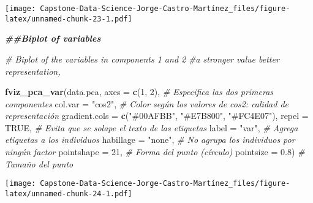 \documentclass[
]{article}
\newenvironment{Shaded}{\begin{snugshade}}{\end{snugshade}}
\newcommand{\AttributeTok}[1]{\textcolor[rgb]{0.13,0.29,0.53}{#1}}
\newcommand{\CommentTok}[1]{\textcolor[rgb]{0.56,0.35,0.01}{\textit{#1}}}
\newcommand{\ConstantTok}[1]{\textcolor[rgb]{0.56,0.35,0.01}{#1}}
\newcommand{\DecValTok}[1]{\textcolor[rgb]{0.00,0.00,0.81}{#1}}
\newcommand{\DocumentationTok}[1]{\textcolor[rgb]{0.56,0.35,0.01}{\textbf{\textit{#1}}}}
\newcommand{\FloatTok}[1]{\textcolor[rgb]{0.00,0.00,0.81}{#1}}
\newcommand{\FunctionTok}[1]{\textcolor[rgb]{0.13,0.29,0.53}{\textbf{#1}}}
\newcommand{\NormalTok}[1]{#1}
\newcommand{\OtherTok}[1]{\textcolor[rgb]{0.56,0.35,0.01}{#1}}
\newcommand{\SpecialCharTok}[1]{\textcolor[rgb]{0.81,0.36,0.00}{\textbf{#1}}}
\newcommand{\StringTok}[1]{\textcolor[rgb]{0.31,0.60,0.02}{#1}}
\begin{document}
\texttt{[image: Capstone-Data-Science-Jorge-Castro-Martínez\_files/figure-latex/unnamed-chunk-23-1.pdf]}

\begin{Shaded}
\begin{Highlighting}[]
\DocumentationTok{\#\#Biplot of variables}

\CommentTok{\# Biplot of the variables in components 1 and 2}
\CommentTok{\#a stronger value better representation,}

\FunctionTok{fviz\_pca\_var}\NormalTok{(data.pca,}
             \AttributeTok{axes =} \FunctionTok{c}\NormalTok{(}\DecValTok{1}\NormalTok{, }\DecValTok{2}\NormalTok{),          }\CommentTok{\# Especifica las dos primeras componentes}
             \AttributeTok{col.var =} \StringTok{"cos2"}\NormalTok{,        }\CommentTok{\# Color según los valores de cos2: calidad de representación}
             \AttributeTok{gradient.cols =} \FunctionTok{c}\NormalTok{(}\StringTok{"\#00AFBB"}\NormalTok{, }\StringTok{"\#E7B800"}\NormalTok{, }\StringTok{"\#FC4E07"}\NormalTok{),}
             \AttributeTok{repel =} \ConstantTok{TRUE}\NormalTok{,            }\CommentTok{\# Evita que se solape el texto de las etiquetas}
             \AttributeTok{label =} \StringTok{"var"}\NormalTok{,           }\CommentTok{\# Agrega etiquetas a los individuos}
             \AttributeTok{habillage =} \StringTok{"none"}\NormalTok{,      }\CommentTok{\# No agrupa los individuos por ningún factor}
             \AttributeTok{pointshape =} \DecValTok{21}\NormalTok{,         }\CommentTok{\# Forma del punto (círculo)}
             \AttributeTok{pointsize =} \FloatTok{0.8}\NormalTok{)         }\CommentTok{\# Tamaño del punto}
\end{Highlighting}
\end{Shaded}

\texttt{[image: Capstone-Data-Science-Jorge-Castro-Martínez\_files/figure-latex/unnamed-chunk-24-1.pdf]}

\begin{Shaded}
\end{Shaded}
\end{document}
